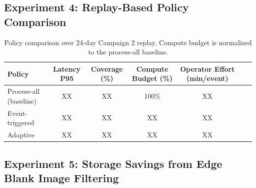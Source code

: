 \documentclass[letterpaper,twocolumn,10pt]{article}
\begin{document}

\subsection{Experiment 4: Replay-Based Policy Comparison}


\begin{table}[t]
\centering
\begin{tabular}{p{2.5cm} cc cc r r}
\toprule
\textbf{Policy} & \textbf{Latency P95} & \textbf{Coverage (\%)} & \textbf{Compute Budget (\%)} & \textbf{Operator Effort (min/event)} \\
\midrule
Process-all (baseline) & XX & XX & 100\% & XX \\
Event-triggered & XX & XX & XX & XX \\
Adaptive & XX & XX & XX & XX \\
\bottomrule
\end{tabular}
\caption{Policy comparison over 24-day Campaign 2 replay. Compute budget is normalized to the process-all baseline.}
\label{table:policy_comparison}
\end{table}


\subsection{Experiment 5: Storage Savings from Edge Blank Image Filtering}

\end{document}
